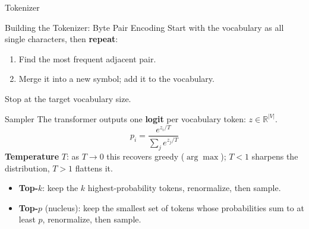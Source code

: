 \documentclass[aspectratio=169]{beamer}
\begin{document}
\begin{frame}{Tokenizer}
\begin{center}
\end{center}
\end{frame}

\begin{frame}{Building the Tokenizer: Byte Pair Encoding}
Start with the vocabulary as all single characters, then \textbf{repeat}:
\begin{enumerate}
\item Find the most frequent adjacent pair.
\item Merge it into a new symbol; add it to the vocabulary.
\end{enumerate}
\medskip
Stop at the target vocabulary size.
\end{frame}

\begin{frame}{Sampler}
The transformer outputs one \textbf{logit} per vocabulary token: $z \in \mathbb{R}^{|V|}$.
\[
p_i = \frac{e^{z_i / T}}{\sum_j e^{z_j / T}}
\]
\textbf{Temperature} $T$: as $T \to 0$ this recovers greedy ($\arg\max$); $T < 1$ sharpens the distribution, $T > 1$ flattens it.
\begin{itemize}
\item \textbf{Top-$k$}: keep the $k$ highest-probability tokens, renormalize, then sample.
\item \textbf{Top-$p$} (nucleus): keep the smallest set of tokens whose probabilities sum to at least $p$, renormalize, then sample.
\end{itemize}
\end{frame}
\end{document}
